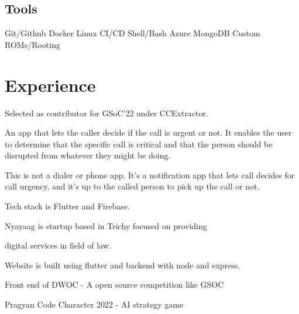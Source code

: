 \documentclass[]{deedy-resume-openfont}
\begin{document}
\begin{minipage}[t]{0.3\textwidth}
\subsection{Tools}
Git/Github  \textbullet{} Docker \textbullet{} Linux \textbullet{} CI/CD
\textbullet{} Shell/Bash \textbullet{} Azure \textbullet{} MongoDB \textbullet{}
Custom ROMs/Rooting \\ 

%
%

\end{minipage} 
\hfill
\begin{minipage}[t]{0.69\textwidth} 

%
%
\section{Experience}
\hfill {}
\begin{tightemize}
    \item Selected as contributor for GSoC'22 under CCExtractor.
    \item An app that lets the caller decide if the call is urgent or not. It enables the user to determine that the specific call is critical and that the person should be disrupted from whatever they might be doing.
    \item This is not a dialer or phone app. It's a notification app that lets call decides for call urgency, and it's up to the called person to pick up the call or not.
	\item Tech stack is Flutter and Firebase.
\end{tightemize}
\hfill {}
\begin{tightemize}
    \item Nyayaag is startup based in Trichy focused on providing 
    
    digital services in field of law.
	\item Website is built using flutter and backend with node and express.
\end{tightemize}
\hfill {}
\begin{tightemize}
	\item Front end of DWOC - A open source competition like GSOC
	\item Pragyan Code Character 2022 - AI strategy game
\end{tightemize}
\sectionsep
%
%

\end{minipage}
\end{document}
